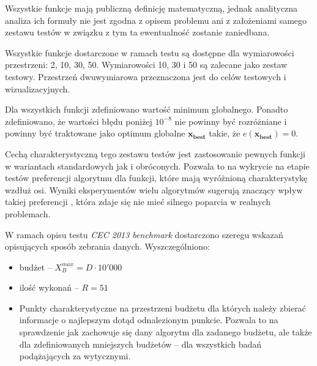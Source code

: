 \documentclass[12pt,a4paper]{report}
\begin{document}
{{{{{{{Wszystkie funkcje mają publiczną definicję matematyczną, jednak analityczna analiza ich formuły nie jest zgodna z opisem problemu ani z założeniami samego zestawu testów w związku z tym ta ewentualność zostanie zaniedbana.
}
\par{
Wszystkie funkcje dostarczone w ramach testu są dostępne dla wymiarowości przestrzeni: 2, 10, 30, 50. Wymiarowości 10, 30 i 50 są zalecane jako zestaw testowy. Przestrzeń dwuwymiarowa przeznaczona jest do celów testowych i wizualizacyjnych.
}
\par{
Dla wszystkich funkcji zdefiniowano wartość minimum globalnego. Ponadto zdefiniowano, że wartości błędu poniżej $10^{-8}$ nie powinny być rozróżniane i powinny być traktowane jako optimum globalne $\mathbf{x_{best}}$ takie, że $e(\mathbf{x_{best}}) = 0$.
}
\par{
Cechą charakterystyczną tego zestawu testów jest zastosowanie pewnych funkcji w wariantach standardowych jak i obróconych. Pozwala to na wykrycie na etapie testów preferencji algorytmu dla funkcji, które mają wyróżnioną charakterystykę wzdłuż osi. Wyniki eksperymentów wielu algorytmów sugerują znaczący wpływ takiej preferencji \cite{JADE,SHADE}, która zdaje się nie mieć silnego poparcia w realnych problemach.
}
\par{
W ramach opisu testu \emph{CEC 2013 benchmark} dostarczono szeregu wskazań opisujących sposób zebrania danych. Wyszczególniono:
\begin{itemize}
\item budżet -- $X_B^{max} = D \cdot 10'000$
\item ilość wykonań -- $R = 51$
\item Punkty charakterystyczne na przestrzeni budżetu dla których należy zbierać informacje o najlepszym dotąd odnalezionym punkcie. Pozwala to na sprawdzenie jak zachowuje się dany algorytm dla zadanego budżetu, ale także dla zdefiniowanych mniejszych budżetów -- dla wszystkich badań podążających za wytycznymi.
\end {itemize}
}

}}}}}}
\end{document}

